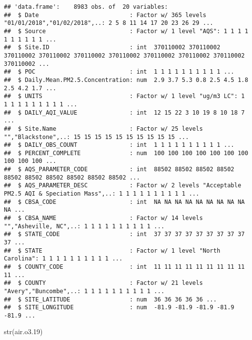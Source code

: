 \documentclass[
]{article}
\newenvironment{Shaded}{\begin{snugshade}}{\end{snugshade}}
\newcommand{\FloatTok}[1]{\textcolor[rgb]{0.00,0.00,0.81}{#1}}
\newcommand{\FunctionTok}[1]{\textcolor[rgb]{0.00,0.00,0.00}{#1}}
\newcommand{\NormalTok}[1]{#1}
\begin{document}
\begin{verbatim}
## 'data.frame':    8983 obs. of  20 variables:
##  $ Date                          : Factor w/ 365 levels "01/01/2018","01/02/2018",..: 2 5 8 11 14 17 20 23 26 29 ...
##  $ Source                        : Factor w/ 1 level "AQS": 1 1 1 1 1 1 1 1 1 1 ...
##  $ Site.ID                       : int  370110002 370110002 370110002 370110002 370110002 370110002 370110002 370110002 370110002 370110002 ...
##  $ POC                           : int  1 1 1 1 1 1 1 1 1 1 ...
##  $ Daily.Mean.PM2.5.Concentration: num  2.9 3.7 5.3 0.8 2.5 4.5 1.8 2.5 4.2 1.7 ...
##  $ UNITS                         : Factor w/ 1 level "ug/m3 LC": 1 1 1 1 1 1 1 1 1 1 ...
##  $ DAILY_AQI_VALUE               : int  12 15 22 3 10 19 8 10 18 7 ...
##  $ Site.Name                     : Factor w/ 25 levels "","Blackstone",..: 15 15 15 15 15 15 15 15 15 15 ...
##  $ DAILY_OBS_COUNT               : int  1 1 1 1 1 1 1 1 1 1 ...
##  $ PERCENT_COMPLETE              : num  100 100 100 100 100 100 100 100 100 100 ...
##  $ AQS_PARAMETER_CODE            : int  88502 88502 88502 88502 88502 88502 88502 88502 88502 88502 ...
##  $ AQS_PARAMETER_DESC            : Factor w/ 2 levels "Acceptable PM2.5 AQI & Speciation Mass",..: 1 1 1 1 1 1 1 1 1 1 ...
##  $ CBSA_CODE                     : int  NA NA NA NA NA NA NA NA NA NA ...
##  $ CBSA_NAME                     : Factor w/ 14 levels "","Asheville, NC",..: 1 1 1 1 1 1 1 1 1 1 ...
##  $ STATE_CODE                    : int  37 37 37 37 37 37 37 37 37 37 ...
##  $ STATE                         : Factor w/ 1 level "North Carolina": 1 1 1 1 1 1 1 1 1 1 ...
##  $ COUNTY_CODE                   : int  11 11 11 11 11 11 11 11 11 11 ...
##  $ COUNTY                        : Factor w/ 21 levels "Avery","Buncombe",..: 1 1 1 1 1 1 1 1 1 1 ...
##  $ SITE_LATITUDE                 : num  36 36 36 36 36 ...
##  $ SITE_LONGITUDE                : num  -81.9 -81.9 -81.9 -81.9 -81.9 ...
\end{verbatim}

\begin{Shaded}
\begin{Highlighting}[]
\FunctionTok{str}\NormalTok{(air.o3}\FloatTok{.19}\NormalTok{)}
\end{Highlighting}
\end{Shaded}
\end{document}
